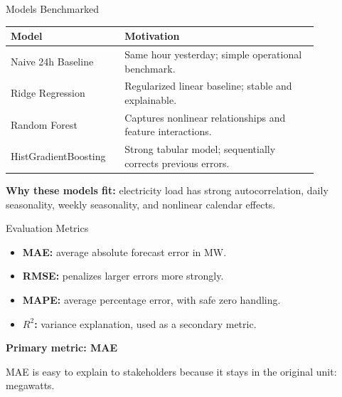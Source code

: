 \documentclass[aspectratio=169]{beamer}
\begin{document}
\begin{frame}{Models Benchmarked}
    \begin{table}
        \centering
        \begin{tabular}{p{0.28\linewidth} p{0.58\linewidth}}
            \toprule
            \textbf{Model} & \textbf{Motivation} \\
            \midrule
            Naive 24h Baseline & Same hour yesterday; simple operational benchmark. \\
            Ridge Regression & Regularized linear baseline; stable and explainable. \\
            Random Forest & Captures nonlinear relationships and feature interactions. \\
            HistGradientBoosting & Strong tabular model; sequentially corrects previous errors. \\
            \bottomrule
        \end{tabular}
    \end{table}

    \vspace{0.2cm}
    \textbf{Why these models fit:} electricity load has strong autocorrelation, daily seasonality, weekly seasonality, and nonlinear calendar effects.
\end{frame}

\begin{frame}{Evaluation Metrics}
    \begin{itemize}
        \item \textbf{MAE:} average absolute forecast error in MW.
        \item \textbf{RMSE:} penalizes larger errors more strongly.
        \item \textbf{MAPE:} average percentage error, with safe zero handling.
        \item \textbf{$R^2$:} variance explanation, used as a secondary metric.
    \end{itemize}

    \vspace{0.4cm}
    \textbf{Primary metric: MAE}

    \vspace{0.15cm}
    MAE is easy to explain to stakeholders because it stays in the original unit: megawatts.
\end{frame}
\end{document}
